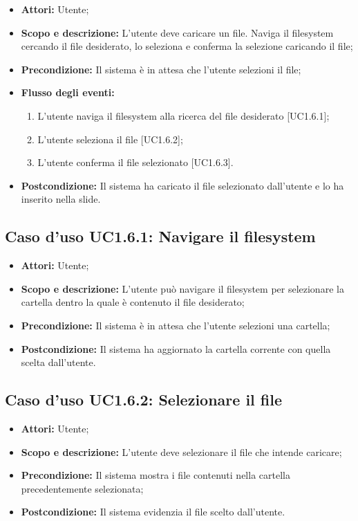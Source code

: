 \begin{itemize}
	\item \textbf{Attori:} Utente;
	\item \textbf{Scopo e descrizione:} L'utente deve caricare un file. Naviga il filesystem cercando il file desiderato, lo seleziona e conferma la selezione caricando il file;
	\item \textbf{Precondizione:} Il sistema è in attesa che l'utente selezioni il file;
	\item \textbf{Flusso degli eventi:}
	\begin{enumerate}
		\item L'utente naviga il filesystem alla ricerca del file desiderato [UC1.6.1];
		\item L'utente seleziona il file [UC1.6.2];
		\item L'utente conferma il file selezionato [UC1.6.3].
	\end{enumerate}
	\item \textbf{Postcondizione:} Il sistema ha caricato il file selezionato dall'utente e lo ha inserito nella slide.
\end{itemize}

\subsection{Caso d'uso UC1.6.1: Navigare il filesystem}
\begin{itemize}
	\item \textbf{Attori:} Utente;
	\item \textbf{Scopo e descrizione:} L'utente può navigare il filesystem per selezionare la cartella dentro la quale è contenuto il file desiderato;
	\item \textbf{Precondizione:} Il sistema è in attesa che l'utente selezioni una cartella;
	\item \textbf{Postcondizione:} Il sistema ha aggiornato la cartella corrente con quella scelta dall'utente.
\end{itemize}

\subsection{Caso d'uso UC1.6.2: Selezionare il file}
\begin{itemize}
	\item \textbf{Attori:} Utente;
	\item \textbf{Scopo e descrizione:} L'utente deve selezionare il file che intende caricare;
	\item \textbf{Precondizione:} Il sistema mostra i file contenuti nella cartella precedentemente selezionata;
	\item \textbf{Postcondizione:} Il sistema evidenzia il file scelto dall'utente.
\end{itemize}

